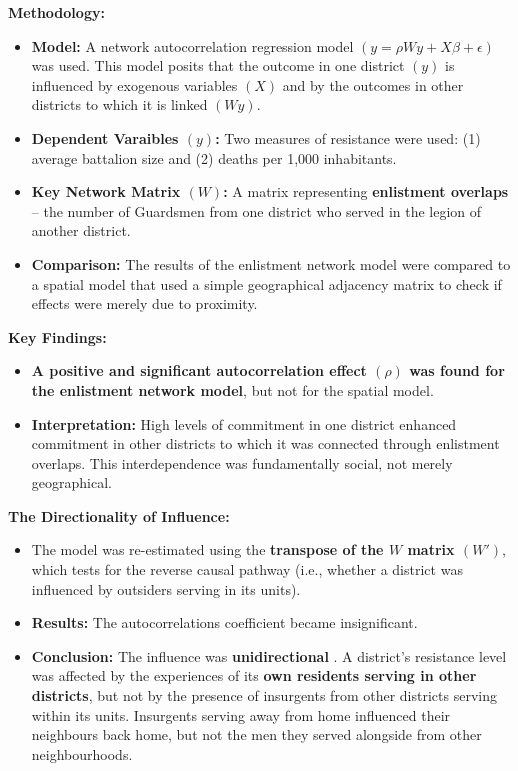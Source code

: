 \documentclass{article}
\begin{document}
    \noindent \textbf{Methodology:}
    \begin{itemize}
        \item \textbf{Model:} A network autocorrelation regression model
        $(y = \rho Wy + X\beta + \epsilon)$ was used. This model posits that
        the outcome in one district $(y)$ is influenced by exogenous
        variables $(X)$ and by the outcomes in other districts to which it
        is linked $(Wy)$.
        \item \textbf{Dependent Varaibles $(y)$:} Two measures of resistance
        were used: (1) average battalion size and (2) deaths per 1,000
        inhabitants.
        \item \textbf{Key Network Matrix $(W)$:} A matrix representing \textbf{enlistment overlaps} -- the number of Guardsmen from one district who served in the legion of another district.
        \item \textbf{Comparison:} The results of the enlistment network
        model were compared to a spatial model that used a simple
        geographical adjacency matrix to check if effects were merely due to
        proximity.
    \end{itemize}

    \noindent \textbf{Key Findings:}
    \begin{itemize}
        \item
        \textbf{A positive and significant autocorrelation effect $(\rho)$ was found for the enlistment network model}, but not for the spatial model.
        \item \textbf{Interpretation:} High levels of commitment in one
        district enhanced commitment in other districts to which it was
        connected through enlistment overlaps. This interdependence was
        fundamentally social, not merely geographical.
    \end{itemize}

    \noindent \textbf{The Directionality of Influence:}
    \begin{itemize}
        \item The model was re-estimated using the
        \textbf{transpose of the $W$ matrix $(W')$}, which tests for the
        reverse causal pathway (i.e., whether a district was influenced by
        outsiders serving in its units).
        \item \textbf{Results:} The autocorrelations coefficient became
        insignificant.
        \item \textbf{Conclusion:} The influence was \textbf{unidirectional}
        . A district's resistance level was affected by the experiences of
        its \textbf{own residents serving in other districts}, but not by
        the presence of insurgents from other districts serving within its
        units. Insurgents serving away from home influenced their neighbours
        back home, but not the men they served alongside from other
        neighbourhoods.
    \end{itemize}
\end{document}
